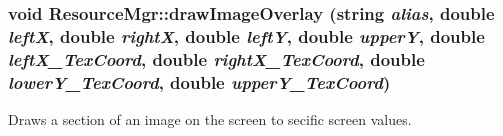 \hypertarget{class_resource_mgr_49b84d0374dd148dd3da6924470950df}{
\subsubsection[{drawImageOverlay}]{\setlength{\rightskip}{0pt plus 5cm}void ResourceMgr::drawImageOverlay (string {\em alias}, \/  double {\em leftX}, \/  double {\em rightX}, \/  double {\em leftY}, \/  double {\em upperY}, \/  double {\em leftX\_\-TexCoord}, \/  double {\em rightX\_\-TexCoord}, \/  double {\em lowerY\_\-TexCoord}, \/  double {\em upperY\_\-TexCoord})}}
\label{class_resource_mgr_49b84d0374dd148dd3da6924470950df}


Draws a section of an image on the screen to secific screen values. 

